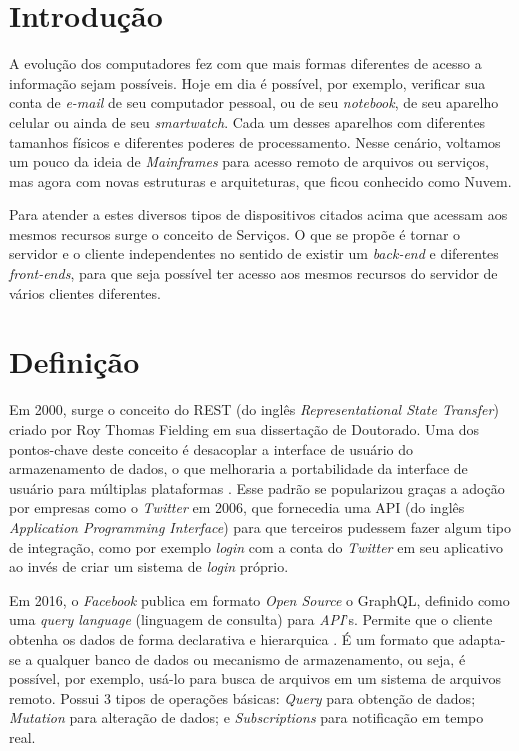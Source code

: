\section{Introdução}\label{introduuxe7uxe3o}

A evolução dos computadores fez com que mais formas diferentes de acesso
a informação sejam possíveis. Hoje em dia é possível, por exemplo,
verificar sua conta de \emph{e-mail} de seu computador pessoal, ou de
seu \emph{notebook}, de seu aparelho celular ou ainda de seu
\emph{smartwatch}. Cada um desses aparelhos com diferentes tamanhos
físicos e diferentes poderes de processamento. Nesse cenário, voltamos
um pouco da ideia de \emph{Mainframes} para acesso remoto de arquivos ou
serviços, mas agora com novas estruturas e arquiteturas, que ficou
conhecido como Nuvem.

Para atender a estes diversos tipos de dispositivos citados acima que
acessam aos mesmos recursos surge o conceito de Serviços. O que se
propõe é tornar o servidor e o cliente independentes
\textemdash\xspace no sentido de existir um \emph{back-end} e diferentes
\emph{front-ends}, para que seja possível ter acesso aos mesmos recursos
do servidor de vários clientes diferentes.

\section{Definição}\label{definiuxe7uxe3o}

Em 2000, surge o conceito do REST (do inglês \emph{Representational
State Transfer}) criado por Roy Thomas Fielding em sua dissertação de
Doutorado. Uma dos pontos-chave deste conceito é desacoplar a interface
de usuário do armazenamento de dados, o que melhoraria a portabilidade
da interface de usuário para múltiplas plataformas \cite{rest:2000}.
Esse padrão se popularizou graças a adoção por empresas como o
\emph{Twitter} em 2006, que fornecedia uma API (do inglês
\emph{Application Programming Interface}) para que terceiros pudessem
fazer algum tipo de integração, como por exemplo \emph{login} com a
conta do \emph{Twitter} em seu aplicativo ao invés de criar um sistema
de \emph{login} próprio.

Em 2016, o \emph{Facebook} publica em formato \emph{Open Source} o
GraphQL, definido como uma \emph{query language} (linguagem de consulta)
para \emph{API}'s. Permite que o cliente obtenha os dados de forma
declarativa e hierarquica \cite{graphql:2016}. É um formato que
adapta-se a qualquer banco de dados ou mecanismo de armazenamento, ou
seja, é possível, por exemplo, usá-lo para busca de arquivos em um
sistema de arquivos remoto. Possui 3 tipos de operações básicas:
\emph{Query} para obtenção de dados; \emph{Mutation} para alteração de
dados; e \emph{Subscriptions} para notificação em tempo real.

